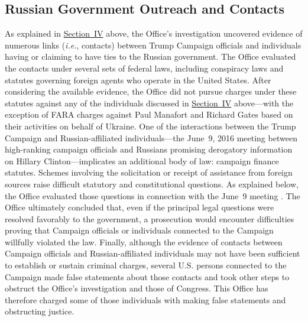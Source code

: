 \subsection{Russian Government Outreach and Contacts}
As explained in \hyperlink{section.1.4}{Section~IV} above, the Office's investigation uncovered evidence of numerous links (\textit{i.e.}, contacts) between Trump Campaign officials and individuals having or claiming to have ties to the Russian government.
The Office evaluated the contacts under several sets of federal laws, including conspiracy laws and statutes governing foreign agents who operate in the United States.
After considering the available evidence, the Office did not pursue charges under these statutes against any of the individuals discussed in \hyperlink{section.1.4}{Section~IV} above---with the exception of FARA charges against Paul Manafort and Richard Gates based on their activities on behalf of Ukraine.
One of the interactions between the Trump Campaign and Russian-affiliated individuals---the June~9, 2016 meeting between high-ranking campaign officials and Russians promising derogatory information on Hillary Clinton---implicates an additional body of law: campaign finance statutes.
Schemes involving the solicitation or receipt of assistance from foreign sources raise difficult statutory and constitutional questions.
As explained below, the Office evaluated those questions in connection with the June~9 meeting .
The Office ultimately concluded that, even if the principal legal questions were resolved favorably to the government, a prosecution would encounter difficulties proving that Campaign officials or individuals connected to the Campaign willfully violated the law.
Finally, although the evidence of contacts between Campaign officials and Russian-affiliated individuals may not have been sufficient to establish or sustain criminal charges, several U.S. persons connected to the Campaign made false statements about those contacts and took other steps to obstruct the Office's investigation and those of Congress.
This Office has therefore charged some of those individuals with making false statements and obstructing justice.

